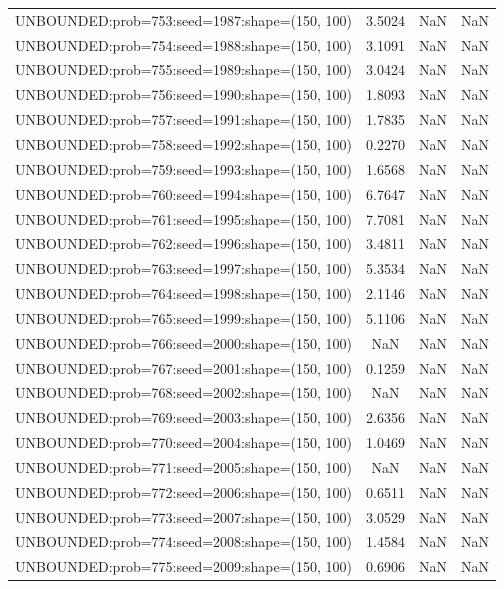 \begin{longtable}{lccc}
UNBOUNDED:prob=753:seed=1987:shape=(150, 100) &  3.5024 &   NaN &    NaN \\
UNBOUNDED:prob=754:seed=1988:shape=(150, 100) &  3.1091 &   NaN &    NaN \\
UNBOUNDED:prob=755:seed=1989:shape=(150, 100) &  3.0424 &   NaN &    NaN \\
UNBOUNDED:prob=756:seed=1990:shape=(150, 100) &  1.8093 &   NaN &    NaN \\
UNBOUNDED:prob=757:seed=1991:shape=(150, 100) &  1.7835 &   NaN &    NaN \\
UNBOUNDED:prob=758:seed=1992:shape=(150, 100) &  0.2270 &   NaN &    NaN \\
UNBOUNDED:prob=759:seed=1993:shape=(150, 100) &  1.6568 &   NaN &    NaN \\
UNBOUNDED:prob=760:seed=1994:shape=(150, 100) &  6.7647 &   NaN &    NaN \\
UNBOUNDED:prob=761:seed=1995:shape=(150, 100) &  7.7081 &   NaN &    NaN \\
UNBOUNDED:prob=762:seed=1996:shape=(150, 100) &  3.4811 &   NaN &    NaN \\
UNBOUNDED:prob=763:seed=1997:shape=(150, 100) &  5.3534 &   NaN &    NaN \\
UNBOUNDED:prob=764:seed=1998:shape=(150, 100) &  2.1146 &   NaN &    NaN \\
UNBOUNDED:prob=765:seed=1999:shape=(150, 100) &  5.1106 &   NaN &    NaN \\
UNBOUNDED:prob=766:seed=2000:shape=(150, 100) &     NaN &   NaN &    NaN \\
UNBOUNDED:prob=767:seed=2001:shape=(150, 100) &  0.1259 &   NaN &    NaN \\
UNBOUNDED:prob=768:seed=2002:shape=(150, 100) &     NaN &   NaN &    NaN \\
UNBOUNDED:prob=769:seed=2003:shape=(150, 100) &  2.6356 &   NaN &    NaN \\
UNBOUNDED:prob=770:seed=2004:shape=(150, 100) &  1.0469 &   NaN &    NaN \\
UNBOUNDED:prob=771:seed=2005:shape=(150, 100) &     NaN &   NaN &    NaN \\
UNBOUNDED:prob=772:seed=2006:shape=(150, 100) &  0.6511 &   NaN &    NaN \\
UNBOUNDED:prob=773:seed=2007:shape=(150, 100) &  3.0529 &   NaN &    NaN \\
UNBOUNDED:prob=774:seed=2008:shape=(150, 100) &  1.4584 &   NaN &    NaN \\
UNBOUNDED:prob=775:seed=2009:shape=(150, 100) &  0.6906 &   NaN &    NaN \\

\end{longtable}
